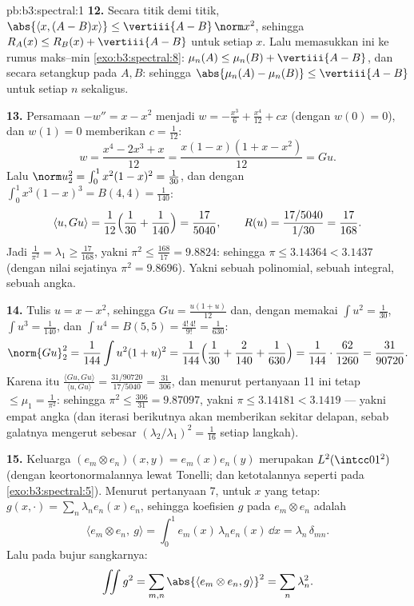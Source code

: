 \begin{solution}{pb:b3:spectral:1}
\textbf{12.} Secara titik demi titik, $\abs{\langle x, (A - B)x\rangle}
\leq \vertiii{A - B}\,\norm x^2$, sehingga $R_A(x) \leq R_B(x) +
\vertiii{A - B}$ untuk setiap $x$. Lalu memasukkan ini ke
rumus maks--min \cref{exo:b3:spectral:8}: $\mu_n(A)
\leq \mu_n(B) + \vertiii{A - B}$, dan secara setangkup pada $A,
B$: sehingga $\abs{\mu_n(A) - \mu_n(B)} \leq \vertiii{A - B}$ untuk
setiap $n$ sekaligus.

\textbf{13.} Persamaan $-w'' = x - x^2$  menjadi $w = -\frac{x^3}6
+ \frac{x^4}{12} + cx$ (dengan $w(0) = 0$), dan $w(1) = 0$
memberikan $c = \frac1{12}$:
\[
w = \frac{x^4 - 2x^3 + x}{12} = \frac{x(1-x)(1 + x -
x^2)}{12} = Gu .
\]
Lalu $\norm u_2^2 = \int_0^1x^2(1-x)^2 = \frac1{30}$, dan
dengan $\int_0^1x^3(1-x)^3 = B(4,4) = \frac1{140}$:
\[
\langle u, Gu\rangle = \frac1{12}\Bigl(\frac1{30} +
\frac1{140}\Bigr) = \frac{17}{5040},
\qquad
R(u) = \frac{17/5040}{1/30} = \frac{17}{168} .
\]
Jadi $\frac1{\pi^2} = \lambda_1 \geq \frac{17}{168}$, yakni
$\pi^2 \leq \frac{168}{17} = 9.8824$: sehingga $\pi \leq 3.14364 <
3.1437$ (dengan nilai sejatinya $\pi^2 = 9.8696$). Yakni sebuah polinomial, sebuah
integral, sebuah angka.

\textbf{14.} Tulis $u = x - x^2$, sehingga $Gu =
\frac{u(1 + u)}{12}$ dan, dengan memakai $\int u^2 = \frac1{30}$,
$\int u^3 = \frac1{140}$, dan $\int u^4 = B(5,5) =
\frac{4!\,4!}{9!} = \frac1{630}$:
\[
\norm{Gu}_2^2 = \frac1{144}\int u^2(1+u)^2 =
\frac1{144}\Bigl(\frac1{30} + \frac2{140} +
\frac1{630}\Bigr) = \frac1{144}\cdot\frac{62}{1260} =
\frac{31}{90720} .
\]
Karena itu $\frac{\langle Gu, Gu\rangle}{\langle u, Gu\rangle} =
\frac{31/90720}{17/5040} = \frac{31}{306}$, dan menurut pertanyaan
11 ini tetap $\leq \mu_1 = \frac1{\pi^2}$: sehingga $\pi^2 \leq
\frac{306}{31} = 9.87097$, yakni $\pi \leq 3.14181 <
3.1419$ --- yakni empat angka (dan iterasi berikutnya akan memberikan
sekitar delapan, sebab galatnya mengerut sebesar
$(\lambda_2/\lambda_1)^2 = \frac1{16}$ setiap langkah).

\textbf{15.} Keluarga $(e_m \otimes e_n)(x,y) =
e_m(x)e_n(y)$ merupakan  $L^2(\intcc01^2)$
(dengan keortonormalannya lewat Tonelli; dan ketotalannya seperti pada
\cref{exo:b3:spectral:5}). Menurut pertanyaan 7, untuk $x$ yang tetap:
$g(x, \cdot) = \sum_n\lambda_ne_n(x)e_n$, sehingga koefisien
$g$ pada $e_m\otimes e_n$ adalah
\[
\langle e_m\otimes e_n,\ g\rangle
= \int_0^1 e_m(x)\,\lambda_n e_n(x)\,\dd x
= \lambda_n\,\delta_{mn} .
\]
Lalu  pada bujur sangkarnya:
\[
\iint g^2 = \sum_{m,n}\abs{\langle e_m\otimes e_n,
g\rangle}^2 = \sum_n\lambda_n^2 .
\]


\end{solution}

